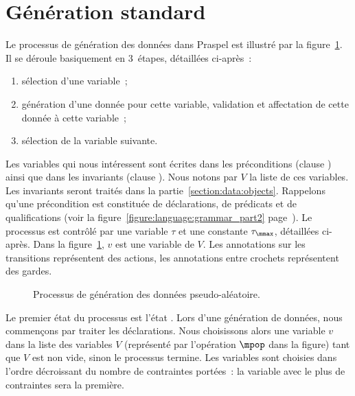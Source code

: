 \section{Génération standard}
\label{section:data:random}

Le processus de génération des données dans Praspel est illustré par la
figure~\ref{figure:data:process}. Il se déroule basiquement en 3~étapes,
détaillées ci-après~:
%
\begin{enumerate}

\item sélection d'une variable~;

\item génération d'une donnée pour cette variable, validation et affectation de
cette donnée à cette variable~;

\item sélection de la variable suivante.

\end{enumerate}

Les variables qui nous intéressent sont écrites dans les préconditions (clause
\arequires) ainsi que dans les invariants (clause \ainvariant). Nous notons par
$V$ la liste de ces variables. Les invariants seront traités dans la
partie~\ref{section:data:objects}. Rappelons qu'une précondition est constituée
de déclarations, de prédicats et de qualifications (voir la
figure~\ref{figure:language:grammar_part2}
page~\pageref{figure:language:grammar_part2}). Le processus est contrôlé par une
variable $\tau$ et une constante $\tau_{\mmax}$, détaillées ci-après.  Dans la
figure~\ref{figure:data:process}, $v$ est une variable de $V$. Les annotations
sur les transitions représentent des actions, les annotations entre crochets
représentent des gardes.
%
\begin{figure}


\caption{\label{figure:data:process} Processus de génération des données
pseudo-aléatoire.}

\end{figure}

Le premier état du processus est l'état . Lors d'une génération de
données, nous commençons par traiter les déclarations. Nous choisissons alors
une variable $v$ dans la liste des variables $V$ (représenté par l'opération
$\mpop$ dans la figure) tant que $V$ est non vide, sinon le processus termine.
Les variables sont choisies dans l'ordre décroissant du nombre de contraintes
portées~: la variable avec le plus de contraintes sera la première.

